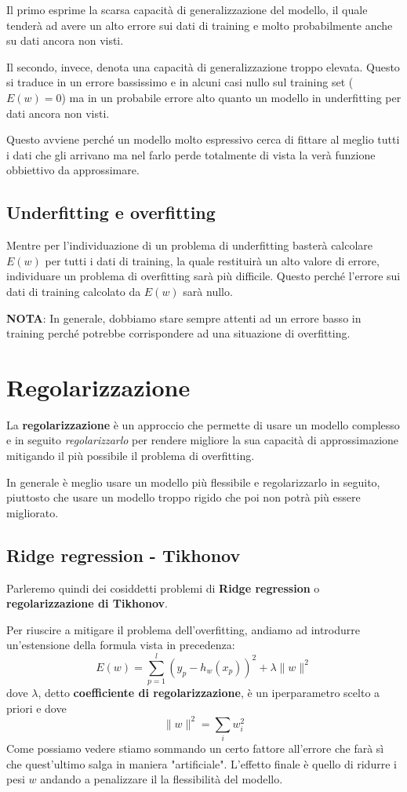 Il primo esprime la scarsa capacit\`a di generalizzazione del modello, il quale tender\`a ad avere un alto errore sui
dati di training e molto probabilmente anche su dati ancora non visti.

Il secondo, invece, denota una capacit\`a di generalizzazione troppo elevata. Questo si traduce in un errore bassissimo
e in alcuni casi nullo sul training set ($E(w) = 0$) ma in un probabile errore alto quanto un modello in underfitting
per dati ancora non visti.

Questo avviene perch\'e un modello molto espressivo cerca di fittare al meglio tutti i dati che gli arrivano ma nel
farlo perde totalmente di vista la ver\`a funzione obbiettivo da approssimare.

\subsection*{Underfitting e overfitting}
Mentre per l'individuazione di un problema di underfitting baster\`a calcolare $E(w)$ per tutti i dati di training,
la quale restituir\`a un alto valore di errore, individuare un problema di overfitting sar\`a pi\`u difficile.
Questo perch\'e l'errore sui dati di training calcolato da $E(w)$ sar\`a nullo.

\textbf{NOTA}: In generale, dobbiamo stare sempre attenti ad un errore basso in training perch\'e potrebbe corrispondere
ad una situazione di overfitting.

\section{Regolarizzazione}
La \textbf{regolarizzazione} \`e un approccio che permette di usare un modello complesso e in seguito
\emph{regolarizzarlo} per rendere migliore la sua capacit\`a di approssimazione mitigando il pi\`u possibile il
problema di overfitting.

In generale \`e meglio usare un modello pi\`u flessibile e regolarizzarlo in seguito, piuttosto che usare un modello
troppo rigido che poi non potr\`a pi\`u essere migliorato.

\subsection{Ridge regression - Tikhonov}
Parleremo quindi dei cosiddetti problemi di \textbf{Ridge regression} o \textbf{regolarizzazione di Tikhonov}.

Per riuscire a mitigare il problema dell'overfitting, andiamo ad introdurre un'estensione della formula vista in
precedenza:
\[ E(w) = \sum_{p = 1}^l (y_p - h_w(x_p))^2 + \lambda \| w \|^2 \]
dove $\lambda$, detto \textbf{coefficiente di regolarizzazione}, \`e un iperparametro scelto a priori e dove
\[ \| w \|^2 = \sum_{i} w_i^2 \]
Come possiamo vedere stiamo sommando un certo fattore all'errore che far\`a s\`i che quest'ultimo salga in maniera
"artificiale". L'effetto finale \`e quello di ridurre i pesi $w$ andando a penalizzare il la flessibilit\`a del modello.

